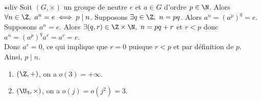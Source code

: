 \documentclass[11pt]{article}
\begin{document}
\vspace*{-0.8cm}

\begin{prop}{$\star$}{div}
    Soit $(G,\times)$ un groupe de neutre $e$ et $a\in G$ d'ordre $p\in\N$. Alors $\forall n \in \Z, ~ a^n=e\iff p \mid n$.
    \tcblower
    \boxed{\la} Supposons $\exists q\in\Z, ~ n=pq$. Alors $a^n=(a^p)^q=e$.\\
    \boxed{\ra} Supposons $a^n=e$. Alors $\exists (q,r)\in\Z\times\N, ~ n=pq+r$ et $r<p$ donc $a^n=(a^p)^qa^r=a^r=e$.\\
    Donc $a^r=0$, ce qui implique que $r=0$ puisque $r<p$ et par définition de $p$. Ainsi, $p\mid n$.
\end{prop}

\vspace*{-0.8cm}

\begin{ex}{}{}
    \begin{enumerate}
        \item $(\Z,+)$, on a $o(3)=+\infty$.
        \item $(\U_3,\times)$, on a $o(j)=o(j^2)=3$.
    \end{enumerate}
\end{ex}

\vspace*{-0.7cm}
\end{document}
